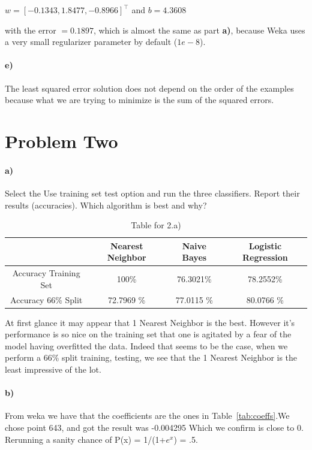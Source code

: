 \documentclass{article}
\begin{document}
\begin{center}
$w = [ -0.1343, 1.8477, -0.8966]^\top$ and $b = 4.3608$ 
\end{center}
with the error $= 0.1897$, which is almost the same as part \textbf{a)}, because Weka uses a very small regularizer parameter by default ($1e-8$).

\paragraph{e)} The least squared error solution does not depend on the order of the examples because what we are trying to minimize is the sum of the squared errors.

\section{Problem Two}
\paragraph{a)}
Select the Use training set test option and run the three classifiers. Report their results (accuracies). Which algorithm is best and why?

\begin{table}[H]
    \begin{center}
    \begin{tabular}{|c|c|c|c|}
   \hline
        & Nearest Neighbor & Naive Bayes & Logistic Regression \\ \hline
         Accuracy Training Set &  100\%&76.3021\% & 78.2552\%   \\ \hline
         Accuracy 66\% Split &  72.7969 \% &77.0115 \% & 80.0766 \% \\\hline
    \end{tabular} \caption{Table for 2.a)}
    \end{center}
\end{table}

At first glance it may appear that 1 Nearest Neighbor is the best. However it's performance is so nice on the training set that one is agitated by a fear of the model having overfitted the data. Indeed that seems to be the case, when we perform a 66\% split training, testing, we see that the 1 Nearest Neighbor is the least impressive of the lot. 

\paragraph{b)}
From weka we have that the coefficients are the ones in Table~\ref{tab:coeffs}.We chose point 643, and got the result was -0.004295 Which we confirm is close to 0. Rerunning a sanity chance of P(x) = 1/(1+$e^x$) = .5. 
\end{document}

